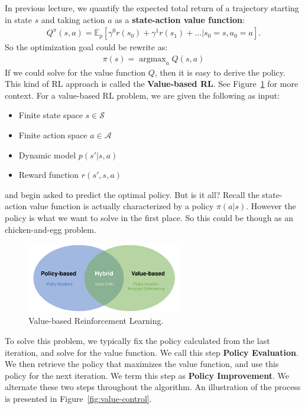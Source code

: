 \documentclass[11pt]{article}
\DeclareMathOperator*{\argmax}{argmax} %
\begin{document}
In previous lecture, we quantify the expected total return of a trajectory starting in state $s$ and taking action $a$ as a \textbf{state-action value function}:
%
\begin{align}
Q^\pi(s, a) = \mathbb{E}_p[\gamma^0 r(s_0) + \gamma^1 r(s_1)+ \dots | s_0 = s, a_0 = a].
\end{align}
%
So the optimization goal could be rewrite as:
%
\begin{align}
\pi(s) = \argmax_a Q(s, a)
\end{align}
%
If we could solve for the value function $Q$, then it is easy to derive the policy. This kind of RL approach is called the \textbf{Value-based RL}. See Figure~\ref{fig:valueRL} for more context. For a value-based RL problem, we are given the following as input:
%
\begin{itemize}
    \item Finite state space $s \in \mathcal{S}$
    \item Finite action space $a \in \mathcal{A}$
    \item Dynamic model $p(s'|s, a)$
    \item Reward function $r(s', s, a)$
\end{itemize}
%
and begin asked to predict the optimal policy. But is it all? Recall the state-action value function is actually characterized by a policy $\pi(a|s)$. However the policy is what we want to solve in the first place. So this could be though as an chicken-and-egg problem. 


\begin{figure}[h]
    \centering
    \includegraphics[width=0.6\textwidth]{Img/value-based-RL.pdf}
    \caption{Value-based Reinforcement Learning.}
    \label{fig:valueRL}
\end{figure}


To solve this problem, we typically fix the policy calculated from the last iteration, and solve for the value function. We call this step \textbf{Policy Evaluation}. We then retrieve the policy that maximizes the value function, and use this policy for the next iteration. We term this step as \textbf{Policy Improvement}. We alternate these two steps throughout the algorithm. An illustration of the process is presented in Figure~\ref{fig:value-control}.
\end{document}
